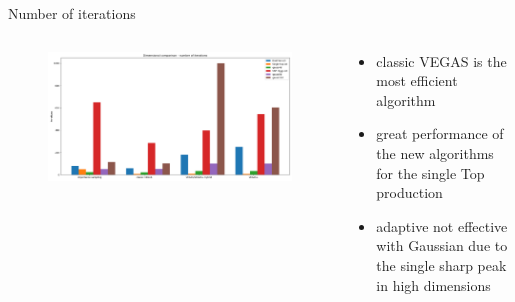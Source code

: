 \documentclass[t,handout,professionalfont,serif]{beamer}
\begin{document}
\begin{frame}{Number of iterations}
	
		\tiny
	\begin{columns}
		\begin{column}{0.7 \textwidth}
			\begin{figure}
				\includegraphics[width= \columnwidth]{../tex/images/iter_final.png}
			\end{figure}
			
		\end{column}
		\hspace{-0.5cm}
		\begin{column}{0.3 \textwidth}
			\vspace{1cm}
			
			\begin{itemize}
				
				\item classic VEGAS is the most efficient algorithm
				\item great performance of the new algorithms for the single Top production
				\item adaptive not effective with Gaussian due to the single sharp peak in high dimensions
			\end{itemize}
		\end{column}
	\end{columns}
	

	
\end{frame}
\end{document}
